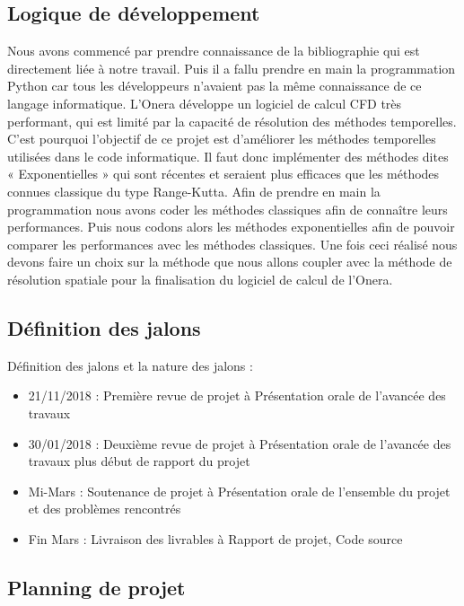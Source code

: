 \documentclass[a4paper,12pt]{report}
\theoremstyle{break}
\begin{document}
\subsection{Logique de développement}

    Nous avons commencé par prendre connaissance de la bibliographie qui est directement liée à notre travail. Puis il a fallu prendre en main la programmation Python car tous les développeurs n’avaient pas la même connaissance de ce langage informatique. L’Onera développe un logiciel de calcul CFD très performant, qui est limité par la capacité de résolution des méthodes temporelles. C’est pourquoi l’objectif de ce projet est d’améliorer les méthodes temporelles utilisées dans le code informatique. Il faut donc implémenter des méthodes dites « Exponentielles » qui sont récentes et seraient plus efficaces que les méthodes connues classique du type Range-Kutta. Afin de prendre en main la programmation nous avons coder les méthodes classiques afin de connaître leurs performances. Puis nous codons alors les méthodes exponentielles afin de pouvoir comparer les performances avec les méthodes classiques. Une fois ceci réalisé nous devons faire un choix sur la méthode que nous allons coupler avec la méthode de résolution spatiale pour la finalisation du logiciel de calcul de l’Onera. 

\subsection{Définition des jalons}

    Définition des jalons et la nature des jalons :
   \begin{itemize}[label=\textbullet]
   	\item 21/11/2018 : Première revue de projet à Présentation orale de l’avancée des travaux
   	\item 30/01/2018 : Deuxième revue de projet à Présentation orale de l’avancée des travaux plus début de rapport du projet
   	\item  Mi-Mars : Soutenance de projet à Présentation orale de l’ensemble du projet et des problèmes rencontrés
   	\item  Fin Mars : Livraison des livrables à Rapport de projet, Code source
    \end{itemize}

\subsection{Planning de projet}
\end{document}
